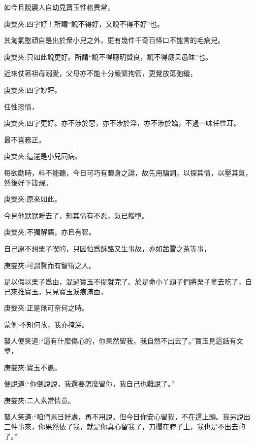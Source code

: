 \begin{parag}
    如今且說襲人自幼見寶玉性格異常，\begin{note}庚雙夾:四字好！所謂“說不得好，又說不得不好”也。\end{note}其淘氣憨頑自是出於衆小兒之外，更有幾件千奇百怪口不能言的毛病兒。\begin{note}庚雙夾:只如此說更好。所謂“說不得聰明賢良，說不得癡呆愚昧”也。\end{note}近來仗著祖母溺愛，父母亦不能十分嚴緊拘管，更覺放蕩弛縱，\begin{note}庚雙夾:四字妙評。\end{note}任性恣情，\begin{note}庚雙夾:四字更好。亦不涉於惡，亦不涉於淫，亦不涉於嬌，不過一味任性耳。\end{note}最不喜務正。\begin{note}庚雙夾:這還是小兒同病。\end{note}每欲勸時，料不能聽，今日可巧有贖身之論，故先用騙詞，以探其情，以壓其氣，然後好下箴規。\begin{note}庚雙夾:原來如此。\end{note}今見他默默睡去了，知其情有不忍，氣已餒墮。\begin{note}庚雙夾:不獨解語，亦且有智。\end{note}自己原不想栗子喫的，只因怕爲酥酪又生事故，亦如茜雪之茶等事，\begin{note}庚雙夾:可謂賢而有智術之人。\end{note}是以假以栗子爲由，混過寶玉不提就完了。於是命小丫頭子們將栗子拿去吃了，自己來推寶玉。只見寶玉淚痕滿面，\begin{note}庚雙夾:正是無可奈何之時。\end{note}\begin{note}蒙側:不知何故，我亦掩涕。\end{note}襲人便笑道:“這有什麼傷心的，你果然留我，我自然不出去了。”寶玉見這話有文章，\begin{note}庚雙夾:寶玉不愚。\end{note}便說道:“你倒說說，我還要怎麼留你，我自己也難說了。”\begin{note}庚雙夾:二人素常情意。\end{note}襲人笑道:“咱們素日好處，再不用說。但今日你安心留我，不在這上頭。我另說出三件事來，你果然依了我，就是你真心留我了，刀擱在脖子上，我也是不出去的了。”
\end{parag}


